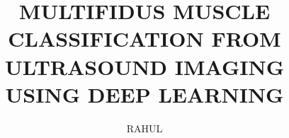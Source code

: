\documentclass[modernstyle,12pt]{thesis}
\title{\uppercase{Multifidus Muscle Classification from Ultrasound Imaging Using Deep Learning}}
\author{\uppercase{Rahul}}{\uppercase{Bisht}}
\begin{document}








\nocite{*}

\end{document}
